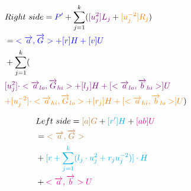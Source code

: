 \documentclass{article}
\theoremstyle{definition}
\begin{document}
\begin{align*}
&Right~side = \textcolor{blue}{P'} + \sum_{j=1}^k ( \textcolor{violet}{[u_j^2] L_j} + \textcolor{orange}{[u_j^{-2}] R_j})\\
&= \textcolor{blue}{< \overrightarrow{a}, \overrightarrow{G}> + [r] H + [v] U}\\
&+ \sum_{j=1}^k (\\
&\textcolor{violet}{[u_j^2] \cdot <\overrightarrow{a}_{lo}, \overrightarrow{G}_{hi}> + [l_j] H + [<\overrightarrow{a}_{lo}, \overrightarrow{b}_{hi}>] U}\\
&\textcolor{orange}{+ [u_j^{-2}] \cdot <\overrightarrow{a}_{hi}, \overrightarrow{G}_{lo}> + [r_j] H + [<\overrightarrow{a}_{hi}, \overrightarrow{b}_{lo}>] U}
)
\end{align*}

\begin{align*}
&Left~side = \textcolor{brown}{[a]G} + \textcolor{cyan}{[r'] H} + \textcolor{magenta}{[ab] U}\\
& = \textcolor{brown}{< \overrightarrow{a}, \overrightarrow{G} >}\\
&+ \textcolor{cyan}{[r + \sum_{j=1}^k (l_j \cdot u_j^2 + r_j u_j^{-2})] \cdot H}\\
&+ \textcolor{magenta}{< \overrightarrow{a}, \overrightarrow{b} > U}
\end{align*}




\end{document}
